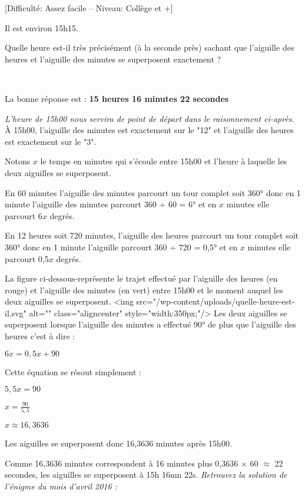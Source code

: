 
%

\begin{center}
\end{center}
[Difficulté: Assez facile – Niveau: Collège et +]

\par
Il est environ 15h15.
\par
Quelle heure est-il très précisément (à la seconde près) sachant que l'aiguille des heures et l'aiguille des minutes se superposent exactement ?
\par
~
\begin{note}La bonne réponse est : \textbf{15 heures 16 minutes 22 secondes}\end{note}
\textit{L'heure de 15h00 nous servira de point de départ dans le raisonnement ci-après.}
À 15h00, l'aiguille des minutes est exactement sur le "12" et l'aiguille des heures est exactement sur le "3".
\par
Notons $x$ le temps en minutes qui s'écoule entre 15h00 et l'heure à laquelle les deux aiguilles se superposent.
\par
En  60 minutes l'aiguille des minutes parcourt un tour complet soit 360° donc en 1 minute l'aiguille des minutes parcourt  360 ÷ 60 = 6° et en $x$ minutes elle parcourt 6$x$ degrés.
\par
En 12 heures soit 720 minutes, l'aiguille des heures parcourt un tour complet soit 360° donc en 1 minute l'aiguille parcourt 360  ÷ 720 = 0,5° et en $x$ minutes elle parcourt 0,5$x$ degrés.
\par
La figure ci-dessous-représente le trajet effectué par l'aiguille des heures (en rouge) et l'aiguille des minutes (en vert) entre 15h00 et le moment auquel les deux aiguilles se superposent.
<img src="/wp-content/uploads/quelle-heure-est-il.svg" alt="" class="aligncenter" style="width:350px;"/>
Les deux aiguilles se superposent lorsque l'aiguille des minutes a effectué 90° de plus que l'aiguille des heures c'est à dire :
\par
$6x=0,5x+90$
\par
Cette équation se résout simplement :
\par
$5,5x=90$
\par
$x=\frac{90}{5,5}$
\par
$x \approx 16,3636$
\par
Les aiguilles se superposent donc 16,3636 minutes après 15h00.
\par
Comme 16,3636 minutes correspondent à 16 minutes plus 0,3636 $\times$ 60 $\approx$ 22 secondes, les aiguilles se superposent à 15h 16mn 22s.
\textit{Retrouvez la solution de l'énigme du mois d'avril 2016 : }
